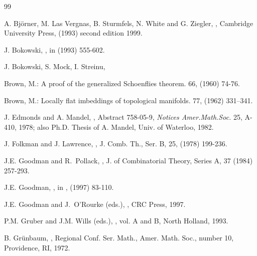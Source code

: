 \documentclass[a4paper]{amsart}
\theoremstyle{definition}
\theoremstyle{remark}
\begin{document}
\begin{thebibliography}{99}


 A. Bj\"{o}rner, M. Las Vergnas, B. Sturmfels, N. White and G. Ziegler,
,
\newblock Cambridge University Press, (1993) second edition 1999.

 J. Bokowski,
,
\newblock in \cite{gruber} (1993) 555-602.

J. Bokowski, S. Mock, I. Streinu,

\newblock Brown, M.:
\newblock A proof of the generalized Schoenflies theorem.
 {66,} (1960) 74-76.

\newblock Brown, M.:
\newblock Locally flat imbeddings of topological manifolds. 
 {77,} (1962) 331--341.

 J. Edmonds and A. Mandel,
,
\newblock Abstract 758-05-9, {\em Notices Amer.Math.Soc.} 25, A-410, 1978;
\newblock also Ph.D. Thesis of A. Mandel, Univ. of Waterloo, 1982.

 J. Folkman and J. Lawrence, 
,
\newblock J. Comb. Th., Ser. B, 25, (1978) 199-236.

 J.E. Goodman and R.~Pollack,
,
\newblock J. of Combinatorial Theory, Series A,
37 (1984) 257-293.

 J.E. Goodman,
,
\newblock in \cite{gor}, (1997) 83-110.

 J.E. Goodman and J.~O'Rourke (eds.),
,
\newblock CRC Press, 1997.

 P.M. Gruber and J.M. Wills (eds.),
,
\newblock vol. A and B, North Holland, 1993.

 B. Gr\"unbaum,
,
\newblock Regional Conf. Ser. Math., Amer. Math. Soc., number 10,
Providence, RI, 1972.


\end{thebibliography}
\end{document}
